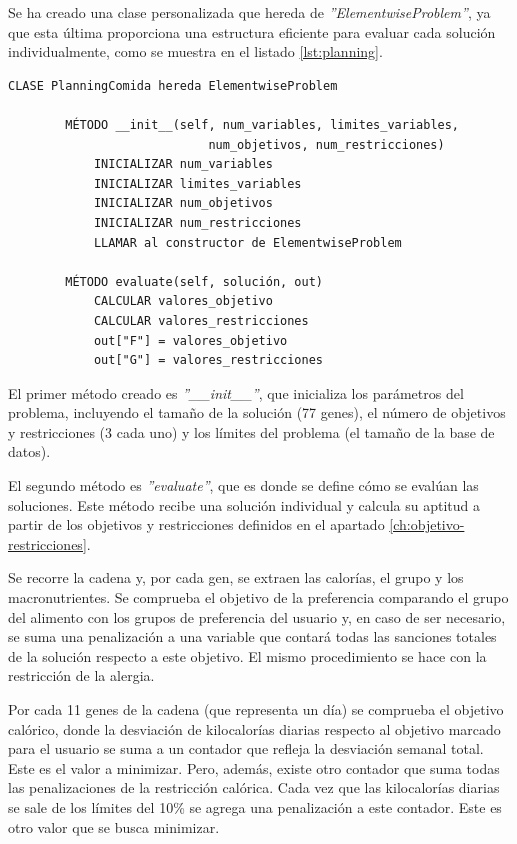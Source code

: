 Se ha creado una clase personalizada que hereda de \textit{''ElementwiseProblem''}, ya que esta última proporciona una estructura eficiente para evaluar cada solución individualmente, como se muestra en el listado \ref{lst:planning}.
\newpage
\begin{lstlisting}[basicstyle=\ttfamily, caption=Clase para la evaluación.,label={lst:planning}]
    CLASE PlanningComida hereda ElementwiseProblem
    
        MÉTODO __init__(self, num_variables, limites_variables,
                            num_objetivos, num_restricciones)
            INICIALIZAR num_variables
            INICIALIZAR limites_variables
            INICIALIZAR num_objetivos
            INICIALIZAR num_restricciones
            LLAMAR al constructor de ElementwiseProblem
    
        MÉTODO evaluate(self, solución, out)
            CALCULAR valores_objetivo
            CALCULAR valores_restricciones
            out["F"] = valores_objetivo
            out["G"] = valores_restricciones
\end{lstlisting}

El primer método creado es \textit{''\_\_init\_\_''}, que inicializa los parámetros del problema, incluyendo el tamaño de la solución (77 genes), el número de objetivos y restricciones (3 cada uno) y los límites del problema (el tamaño de la base de datos).

El segundo método es \textit{''evaluate''}, que es donde se define cómo se evalúan las soluciones. Este método recibe una solución individual y calcula su aptitud a partir de los objetivos y restricciones definidos en el apartado \ref{ch:objetivo-restricciones}.

Se recorre la cadena y, por cada gen, se extraen las calorías, el grupo y los macronutrientes. Se comprueba el objetivo de la preferencia comparando el grupo del alimento con los grupos de preferencia del usuario y, en caso de ser necesario, se suma una penalización a una variable que contará todas las sanciones totales de la solución respecto a este objetivo. El mismo procedimiento se hace con la restricción de la alergia.

Por cada 11 genes de la cadena (que representa un día) se comprueba el objetivo calórico, donde la desviación de kilocalorías diarias respecto al objetivo marcado para el usuario se suma a un contador que refleja la desviación semanal total. Este es el valor a minimizar. Pero, además, existe otro contador que suma todas las penalizaciones de la restricción calórica. Cada vez que las kilocalorías diarias se sale de los límites del 10\% se agrega una penalización a este contador. Este es otro valor que se busca minimizar.

